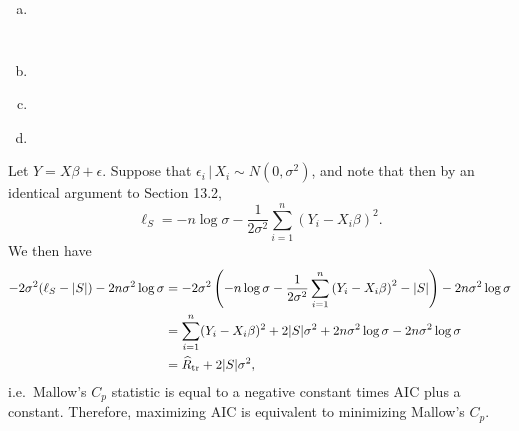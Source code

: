 \begin{ex}
  \begin{enumerate}[(a)]
    \item~
          \inputminted{python}{../code/ex13_07a.py}
          \inputminted{text}{../output/ex13_07a.txt}
    \item
          \inputminted{python}{../code/ex13_07b.py}
          \inputminted{text}{../output/ex13_07b.txt}
    \item
          \inputminted{python}{../code/ex13_07c.py}
          \inputminted{text}{../output/ex13_07c.txt}
    \item
          \inputminted{python}{../code/ex13_07d.py}
          \inputminted{text}{../output/ex13_07d.txt}
  \end{enumerate}
\end{ex}

\begin{ex}
  Let $Y=X\beta+\epsilon$. Suppose that $\epsilon_i\,|\,X_i\sim N(0,\sigma^2)$,
  and note that then by an identical argument to Section 13.2,
  \[
    \ell_S
    =-n\log{\sigma}
    -\frac{1}{2\sigma^2}\sum_{i=1}^n\left(Y_i-X_i\beta\right)^2.
  \]
  We then have
  \begin{align*}
    -2\sigma^2(\ell_S-|S|)-2n\sigma^2\log{\sigma}
     & =-2\sigma^2\left(
    -n\log{\sigma}-\frac{1}{2\sigma^2}\sum_{i=1}^n\left(Y_i-X_i\beta\right)^2-|S|
    \right)-2n\sigma^2\log{\sigma}                                                              \\
     & =\sum_{i=1}^n(Y_i-X_i\beta)^2+2|S|\sigma^2+2n\sigma^2\log{\sigma}-2n\sigma^2\log{\sigma} \\
     & =\widehat{R}_\text{tr}+2|S|\sigma^2,
  \end{align*}
  i.e.\ Mallow's $C_p$ statistic is equal to a negative constant times AIC plus
  a constant. Therefore, maximizing AIC is equivalent to minimizing Mallow's
  $C_p$.
\end{ex}

